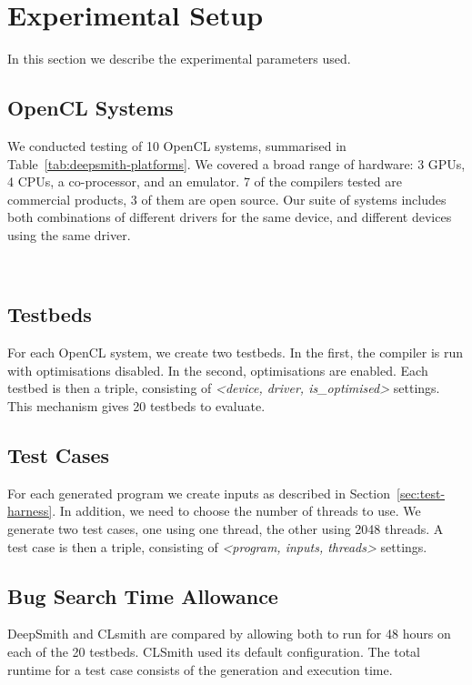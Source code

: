 \section{Experimental Setup}
\label{sec:deepsmith-experimental-setup}

In this section we describe the experimental parameters used.

\subsection{OpenCL Systems}

We conducted testing of 10 OpenCL systems, summarised in
Table~\ref{tab:deepsmith-platforms}. We covered a broad range of hardware: 3 GPUs, 4
CPUs, a co-processor, and an emulator. 7 of the compilers tested are commercial
products, 3 of them are open source. Our suite of systems includes both
combinations of different drivers for the same device, and different devices
using the same driver.

\begin{table}
  \centering %
  \subfloat[][]{}%
  \\%
  \subfloat[][]{} %
  \caption[OpenCL systems and the number of bug reports submitted to date]{%
    OpenCL systems and the number of bug reports submitted to date (22\% of which have been fixed, the remainder are pending). For each system, two testbeds are created, one with compiler optimisations, the other without.%
  }
  \label{tab:deepsmith-platforms}
\end{table}

\subsection{Testbeds}

For each OpenCL system, we create two testbeds. In the first, the compiler is
run with optimisations disabled. In the second, optimisations are enabled. Each
testbed is then a triple, consisting of \emph{<device, driver, is\_optimised>}
settings. This mechanism gives 20 testbeds to evaluate.


\subsection{Test Cases}

For each generated program we create inputs as described in
Section~\ref{sec:test-harness}. In addition, we need to choose the number of
threads to use. We generate two test cases, one using one thread, the other
using 2048 threads. A test case is then a triple, consisting of \emph{<program,
inputs, threads>} settings.

\subsection{Bug Search Time Allowance}

DeepSmith and CLsmith are compared by allowing both to run for 48 hours on
each of the 20 testbeds. CLSmith used its default configuration. The total
runtime for a test case consists of the generation and execution time.
